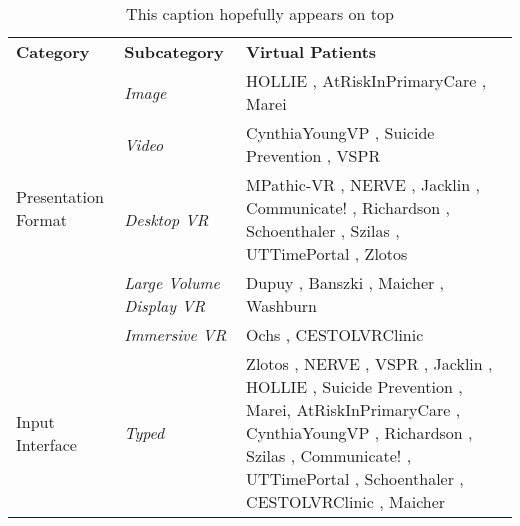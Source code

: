 \begin{table} [t]
\scriptsize{
\begin{center}
    \caption{This caption hopefully appears on top}
    \label{tab:somerandomtable2}
    \begin{tabular}{| p{1.8cm} | p{2cm} | p{8cm} |}
    \hline
        \rowcolor{mygray}
        \multicolumn{3}{|C|}{\textbf{Technical Design}}\\
    \hline
        \rowcolor{lightgray}
        \textbf{Category}  & \textbf{Subcategory} & \textbf{Virtual Patients}\\
    \hline
        \multirow{5}{}{Presentation Format} & \emph{Image} & HOLLIE \cite{adefila2020students}, AtRiskInPrimaryCare \cite{albright2018using}, Marei \cite{marei2018use}\\
    \cline{2-3}
        & \emph{Video} & CynthiaYoungVP \cite{foster2016using}, Suicide Prevention \cite{o2019suicide}, VSPR \cite{peddle2019exploring,peddle2019development}\\
    \cline{2-3}
        & \emph{Desktop VR} & MPathic-VR \cite{guetterman2019medical,kron2017using}, NERVE
        \cite{hirumi2016advancingPart2,hirumi2016advancing,kleinsmith2015understanding}, Jacklin \cite{jacklin2019virtual,jacklin2018improving}, 
        Communicate! \cite{jeuring2015communicate}, Richardson \cite{richardson2019virtual}, Schoenthaler \cite{schoenthaler2017simulated}, Szilas \cite{szilas2019virtual}, UTTimePortal \cite{zielke2016beyond,zielke2016using}, Zlotos \cite{zlotos2016scenario}\\
    \cline{2-3}
        & \emph{Large Volume Display VR} & Dupuy \cite{dupuy2019virtual}, Banszki \cite{banszki2018clinical,quail2016student}, Maicher \cite{maicher2017developing}, Washburn \cite{washburn2020virtual}\\
    \cline{2-3}
        & \emph{Immersive VR} & Ochs \cite{ochs2019training}, CESTOLVRClinic \cite{sapkaroski2018implementation}\\
    \hline
        \multirow{5}{}{Input Interface} & \emph{Typed} & Zlotos \cite{zlotos2016scenario}, NERVE
        \cite{hirumi2016advancingPart2,hirumi2016advancing,kleinsmith2015understanding}, VSPR \cite{peddle2019exploring,peddle2019development}, Jacklin \cite{jacklin2019virtual,jacklin2018improving}, HOLLIE \cite{adefila2020students}, Suicide Prevention \cite{o2019suicide}, Marei\cite{marei2018use}, AtRiskInPrimaryCare \cite{albright2018using}, CynthiaYoungVP \cite{foster2016using}, Richardson \cite{richardson2019virtual}, Szilas \cite{szilas2019virtual}, Communicate! \cite{jeuring2015communicate}, UTTimePortal \cite{zielke2016beyond,zielke2016using}, Schoenthaler \cite{schoenthaler2017simulated}, CESTOLVRClinic \cite{sapkaroski2018implementation}, Maicher \cite{maicher2017developing}  \\

\end{tabular}
\end{center}}
\end{table}
